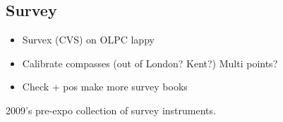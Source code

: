     \subsection{Survey}
        \begin{itemize}
            \item Survex (CVS) on OLPC lappy
            \item Calibrate compasses (out of London? Kent?) Multi points?
            \item Check + pos make more survey books
        \end{itemize}
\begin{marginfigure}
\checkoddpage \ifoddpage \forcerectofloat \else \forceversofloat \fi
\centering
 \caption{2009's pre-expo collection of survey instruments. }
 \label{survey collection 2009}
 \end{marginfigure}

